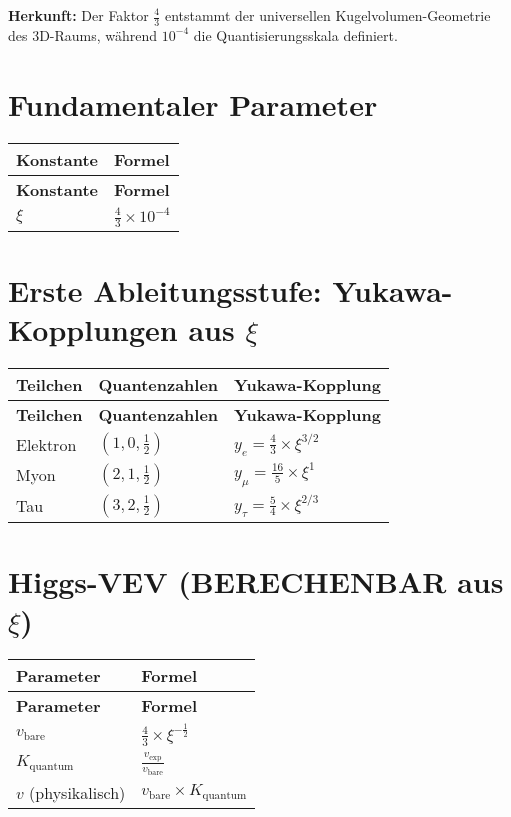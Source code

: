 \documentclass[12pt,a4paper]{article}
\begin{document}
	\textbf{Herkunft:} Der Faktor $\frac{4}{3}$ entstammt der universellen Kugelvolumen-Geometrie des 3D-Raums, während $10^{-4}$ die Quantisierungsskala definiert.
	
	\section{Fundamentaler Parameter}
	
	\begin{longtable}{|p{3cm}|p{4cm}|}
		\hline
		\textbf{Konstante} & \textbf{Formel} \\
		\hline
		\endfirsthead
		\hline
		\textbf{Konstante} & \textbf{Formel} \\
		\hline
		\endhead
		\(\xi\) & \(\frac{4}{3} \times 10^{-4}\) \\
		\hline
	\end{longtable}
	
	\section{Erste Ableitungsstufe: Yukawa-Kopplungen aus \(\xi\)}
	
	\begin{longtable}{|p{2.5cm}|p{3cm}|p{4cm}|}
		\hline
		\textbf{Teilchen} & \textbf{Quantenzahlen} & \textbf{Yukawa-Kopplung} \\
		\hline
		\endfirsthead
		\hline
		\textbf{Teilchen} & \textbf{Quantenzahlen} & \textbf{Yukawa-Kopplung} \\
		\hline
		\endhead
		Elektron & \((1,0,\frac{1}{2})\) & \(y_e = \frac{4}{3} \times \xi^{3/2}\) \\
		\hline
		Myon & \((2,1,\frac{1}{2})\) & \(y_{\mu} = \frac{16}{5} \times \xi^{1}\) \\
		\hline
		Tau & \((3,2,\frac{1}{2})\) & \(y_{\tau} = \frac{5}{4} \times \xi^{2/3}\) \\
		\hline
	\end{longtable}
	
	\section{Higgs-VEV (BERECHENBAR aus \(\xi\))}
	
	\begin{longtable}{|p{3cm}|p{4cm}|}
		\hline
		\textbf{Parameter} & \textbf{Formel} \\
		\hline
		\endfirsthead
		\hline
		\textbf{Parameter} & \textbf{Formel} \\
		\hline
		\endhead
		\(v_{\text{bare}}\) & \(\frac{4}{3} \times \xi^{-\frac{1}{2}}\) \\
		\hline
		\(K_{\text{quantum}}\) & \(\frac{v_{\text{exp}}}{v_{\text{bare}}}\) \\
		\hline
		\(v\) (physikalisch) & \(v_{\text{bare}} \times K_{\text{quantum}}\) \\
		\hline
	\end{longtable}
	
\end{document}
